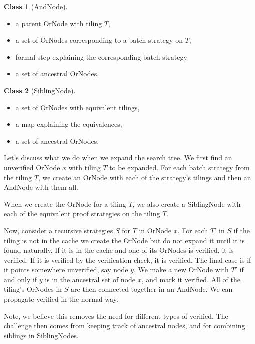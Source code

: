\documentclass{amsart}
\theoremstyle{definition}
\newtheorem{class}{Class}
\theoremstyle{remark}
\begin{document}
\begin{class}[AndNode]
\leavevmode
\begin{itemize}
  \item a parent OrNode with tiling $T$,
  \item a set of OrNodes corresponding to a batch strategy on $T$,
  \item formal step explaining the corresponding batch strategy
  \item a set of ancestral OrNodes.
\end{itemize}
\end{class}

\begin{class}[SiblingNode]
  \leavevmode
\begin{itemize}
  \item a set of OrNodes with equivalent tilings,
  \item a map explaining the equivalences,
  \item a set of ancestral OrNodes.
\end{itemize}
\end{class}

Let's discuss what we do when we expand the search tree. We first find an
unverified OrNode $x$ with tiling $T$ to be expanded. For each batch strategy
from the tiling $T$, we create an OrNode with each of the strategy's tilings and
then an AndNode with them all.

When we create the OrNode for a tiling $T$, we also create a SiblingNode with
each of the equivalent proof strategies on the tiling $T$.

Now, consider a recursive strategies $S$ for $T$ in OrNode $x$. For each $T'$ in
$S$ if the tiling is not in the cache we create the OrNode but do not expand it
until it is found naturally. If it is in the cache and one of its OrNodes is
verified, it is verified. If it is verified by the verification check, it is
verified. The final case is if it points somewhere unverified, say node $y$. We
make a new OrNode with $T'$ if and only if $y$ is in the ancestral set of node
$x$, and mark it verified. All of the tiling's OrNodes in $S$ are then connected
together in an AndNode. We can propagate verified in the normal way.

Note, we believe this removes the need for different types of verified. The
challenge then comes from keeping track of ancestral nodes, and for combining
siblings in SiblingNodes.
\end{document}
